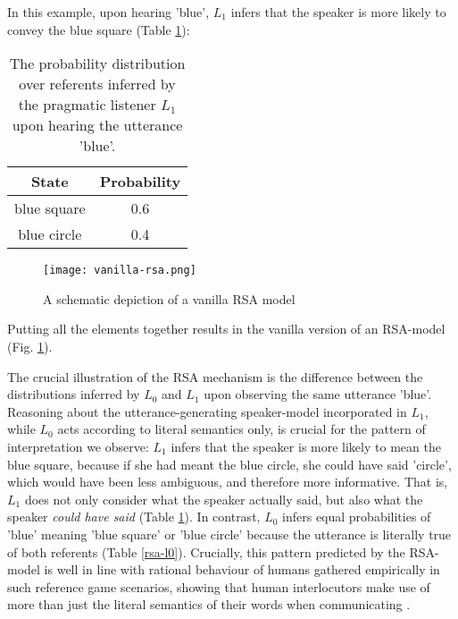 In this example, upon hearing 'blue', $L_1$ infers that the speaker is more likely to convey the blue square (Table \ref{rsa-l1}):

\begin{table}[h]
	\begin{center}
		\caption{The probability distribution over referents inferred by the pragmatic listener $L_1$ upon hearing the utterance 'blue'.}
		\label{rsa-l1}
		\vskip 0.12in
		\begin{tabular}{cc}
			State & Probability \\
			\hline
			blue square & 0.6 \\
			blue circle & 0.4
		\end{tabular}
	\end{center}
\end{table}

\begin{figure*}[t]
	\begin{center}
		\texttt{[image: vanilla-rsa.png]}
	\end{center}
	\vspace{-0.3cm}
	\caption{A schematic depiction of a vanilla RSA model \parencite{problang}}
	\label{vanilla-rsa}
\end{figure*}
Putting all the elements together results in the vanilla version of an RSA-model (Fig. \ref{vanilla-rsa}).

The crucial illustration of the RSA mechanism is the difference between the distributions inferred by $L_0$ and $L_1$ upon observing the same utterance 'blue'. Reasoning about the utterance-generating speaker-model incorporated in $L_1$, while $L_0$ acts according to literal semantics only, is crucial for the pattern of interpretation we observe: $L_1$ infers that the speaker is more likely to mean the blue square, because if she had meant the blue circle, she could have said 'circle', which would have been less ambiguous, and therefore more informative. That is, $L_1$ does not only consider what the speaker actually said, but also what the speaker \emph{could have said} (Table \ref{rsa-l1}). In contrast, $L_0$ infers equal probabilities of 'blue' meaning 'blue square' or 'blue circle' because the utterance is literally true of both referents (Table \ref{rsa-l0}). Crucially, this pattern predicted by the RSA-model is well in line with rational behaviour of humans gathered empirically in such reference game scenarios, showing that human interlocutors make use of more than just the literal semantics of their words when communicating \parencite{frank2012predicting, problang}.

